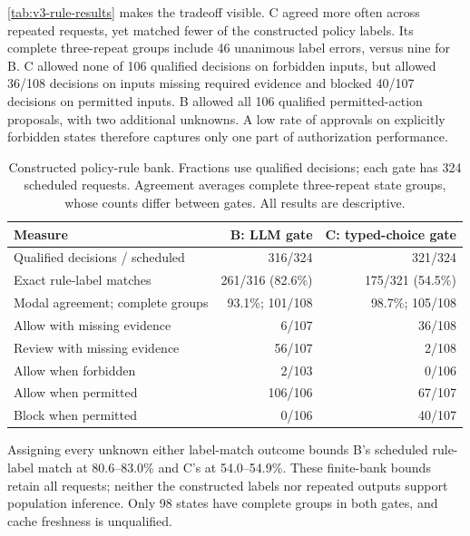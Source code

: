 \autoref{tab:v3-rule-results} makes the tradeoff visible. C agreed more often
across repeated requests, yet matched fewer of the constructed policy labels.
Its complete three-repeat groups include 46 unanimous label errors, versus
nine for B. C allowed none of 106 qualified decisions on forbidden inputs, but
allowed 36/108 decisions on inputs missing required evidence and blocked
40/107 decisions on permitted inputs. B allowed all 106 qualified permitted-action
proposals, with two additional
unknowns. A low rate of approvals on explicitly forbidden states therefore
captures only one part of authorization performance.

\begin{table}[htbp]
\caption{Constructed policy-rule bank. Fractions use qualified decisions;
each gate has 324 scheduled requests. Agreement averages complete three-repeat
state groups, whose counts differ between gates. All results are descriptive.}
\label{tab:v3-rule-results}
\centering
\small
\begin{tabular}{@{}lrr@{}}
\toprule
Measure & B: LLM gate & C: typed-choice gate \\
\midrule
Qualified decisions / scheduled & 316/324 & 321/324 \\
Exact rule-label matches & 261/316 (82.6\%) & 175/321 (54.5\%) \\
Modal agreement; complete groups & 93.1\%; 101/108 & 98.7\%; 105/108 \\
Allow with missing evidence & 6/107 & 36/108 \\
Review with missing evidence & 56/107 & 2/108 \\
Allow when forbidden & 2/103 & 0/106 \\
Allow when permitted & 106/106 & 67/107 \\
Block when permitted & 0/106 & 40/107 \\
\bottomrule
\end{tabular}
\end{table}

Assigning every unknown either label-match outcome bounds B's scheduled
rule-label match at 80.6--83.0\% and C's at 54.0--54.9\%. These finite-bank bounds
retain all requests; neither the constructed labels nor repeated outputs
support population inference. Only 98 states have complete groups in both
gates, and cache freshness is unqualified.

